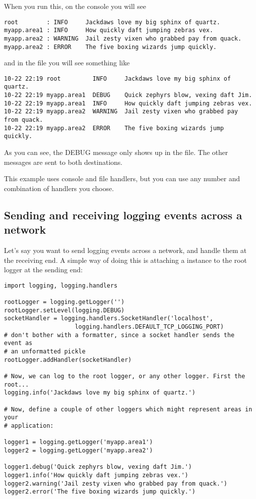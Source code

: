 When you run this, on the console you will see

\begin{verbatim}
root        : INFO     Jackdaws love my big sphinx of quartz.
myapp.area1 : INFO     How quickly daft jumping zebras vex.
myapp.area2 : WARNING  Jail zesty vixen who grabbed pay from quack.
myapp.area2 : ERROR    The five boxing wizards jump quickly.
\end{verbatim}

and in the file you will see something like

\begin{verbatim}
10-22 22:19 root         INFO     Jackdaws love my big sphinx of quartz.
10-22 22:19 myapp.area1  DEBUG    Quick zephyrs blow, vexing daft Jim.
10-22 22:19 myapp.area1  INFO     How quickly daft jumping zebras vex.
10-22 22:19 myapp.area2  WARNING  Jail zesty vixen who grabbed pay from quack.
10-22 22:19 myapp.area2  ERROR    The five boxing wizards jump quickly.
\end{verbatim}

As you can see, the DEBUG message only shows up in the file. The other
messages are sent to both destinations.

This example uses console and file handlers, but you can use any number and
combination of handlers you choose.

\subsection{Sending and receiving logging events across a network
\label{network-logging}}

Let's say you want to send logging events across a network, and handle them
at the receiving end. A simple way of doing this is attaching a
 instance to the root logger at the sending end:

\begin{verbatim}
import logging, logging.handlers

rootLogger = logging.getLogger('')
rootLogger.setLevel(logging.DEBUG)
socketHandler = logging.handlers.SocketHandler('localhost',
                    logging.handlers.DEFAULT_TCP_LOGGING_PORT)
# don't bother with a formatter, since a socket handler sends the event as
# an unformatted pickle
rootLogger.addHandler(socketHandler)

# Now, we can log to the root logger, or any other logger. First the root...
logging.info('Jackdaws love my big sphinx of quartz.')

# Now, define a couple of other loggers which might represent areas in your
# application:

logger1 = logging.getLogger('myapp.area1')
logger2 = logging.getLogger('myapp.area2')

logger1.debug('Quick zephyrs blow, vexing daft Jim.')
logger1.info('How quickly daft jumping zebras vex.')
logger2.warning('Jail zesty vixen who grabbed pay from quack.')
logger2.error('The five boxing wizards jump quickly.')
\end{verbatim}

